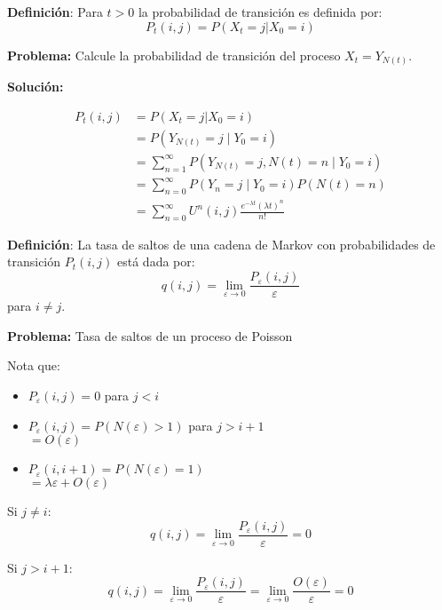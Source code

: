 \documentclass[12pt,a4paper]{article}
\newcommand{\definicion}[1]{%
\begin{definicionbox}
\textbf{Definición}: #1
\end{definicionbox}
}
\begin{document}
\definicion{Para $t > 0$ la probabilidad de transición es definida por:
\begin{equation*}
P_t(i,j) = P(X_t = j | X_0 = i)
\end{equation*}}

\textbf{Problema:} Calcule la probabilidad de transición del proceso $X_t = Y_{N(t)}$.

\textbf{Solución:}

\begin{align*}
P_t(i,j) &= P(X_t = j | X_0 = i) \\
&= P\left(Y_{N(t)} = j \mid Y_0 = i\right) \\
&= \sum_{n=1}^{\infty} P\left(Y_{N(t)} = j, N(t) = n \mid Y_0 = i\right) \\
&= \sum_{n=0}^{\infty} P\left(Y_n = j \mid Y_0 = i\right) P(N(t) = n) \\
&= \sum_{n=0}^{\infty} U^n(i,j) \frac{e^{-\lambda t}(\lambda t)^n}{n!}
\end{align*}

\definicion{La tasa de saltos de una cadena de Markov con probabilidades de transición $P_t(i,j)$ está dada por:
\begin{equation*}
q(i,j) = \lim_{\varepsilon \to 0} \frac{P_\varepsilon(i,j)}{\varepsilon}
\end{equation*}
para $i \neq j$.}

\textbf{Problema:} Tasa de saltos de un proceso de Poisson

Nota que:

\begin{itemize}
    \item $P_\varepsilon(i,j) = 0$ para $j < i$
    \item $P_\varepsilon(i,j) = P(N(\varepsilon) > 1)$ para $j > i+1$\\
    \hspace{1.5em} $= O(\varepsilon)$
    \item $P_\varepsilon(i, i+1) = P(N(\varepsilon) = 1)$\\
    \hspace{1.5em} $= \lambda\varepsilon + O(\varepsilon)$
\end{itemize}

Si $j \neq i$:
\begin{equation*}
q(i,j) = \lim_{\varepsilon \to 0} \frac{P_\varepsilon(i,j)}{\varepsilon} = 0
\end{equation*}

Si $j > i+1$:
\begin{equation*}
q(i,j) = \lim_{\varepsilon \to 0} \frac{P_\varepsilon(i,j)}{\varepsilon} = \lim_{\varepsilon \to 0} \frac{O(\varepsilon)}{\varepsilon} = 0
\end{equation*}
\end{document}
